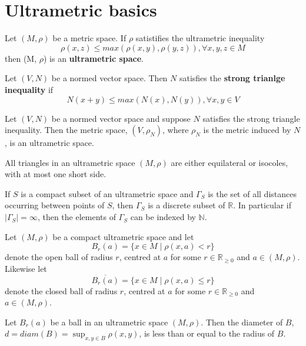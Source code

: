 \section*{Ultrametric basics}


\begin{definition*}
	 Let $(M, \rho)$ be a metric space. If $\rho$ satistifies the ultrametric inequality
	\[\rho(x,z) \leq max{(\rho(x,y), \rho(y,z))}, \forall x,y,z \in M\] 
	then (M, $\rho$) is an \textbf{ultrametric space}.
\end{definition*}

\begin{definition*}
	 Let $(V, N)$ be a normed vector space. Then $N$ satisfies the \textbf{strong trianlge inequality} if
	\[N(x + y) \leq max(N(x), N(y)), \forall x,y \in V \]
\end{definition*}

\begin{proposition*}
	Let $(V,N)$ be a normed vector space and suppose $N$ satisfies the strong triangle inequality. Then the metric space, $(V,\rho_N)$, where $\rho_N$ is the metric induced by $N$, is an ultrametric space.
\end{proposition*}

\begin{proposition*}
	\cite{ar} All triangles in an ultrametric space $(M,\rho)$ are either equilateral or isocoles, with at most one short side. 
\end{proposition*}


\begin{proposition*}
\cite{ar} If $S$ is a compact subset of an ultrametric space and $\Gamma_S$ is the set of all distances occurring between points of $S$, then $\Gamma_S$ is a discrete subset of $\mathbb{R}$. In particular if $\mid \Gamma_S\mid = \infty$, then the elements of $\Gamma_S$ can be indexed by $\mathbb{N}$.
\end{proposition*}

\noindent Let $(M, \rho)$ be a compact ultrametric space and let \[B_r(a)=\{x \in M \mid \rho(x,a) < r\}\] denote the open ball of radius $r$, centred at $a$ for some $r \in \mathbb{R}_{\geq 0}$ and $a \in (M,\rho)$. Likewise let \[\overline{ B_r(a)}=\{x \in M \mid \rho(x,a) \leq r\}\]  denote the closed ball of radius $r$, centred at $a$ for some $r \in \mathbb{R}_{\geq 0}$ and $a \in (M,\rho)$.

\begin{proposition*}
	Let $B_r(a)$ be a ball in an ultrametric space $(M,\rho)$. Then the diameter of $B$, $d=diam(B)=\sup_{x,y \in B}{\rho(x,y)}$, is less than or equal to the radius of $B$.    
\end{proposition*}

